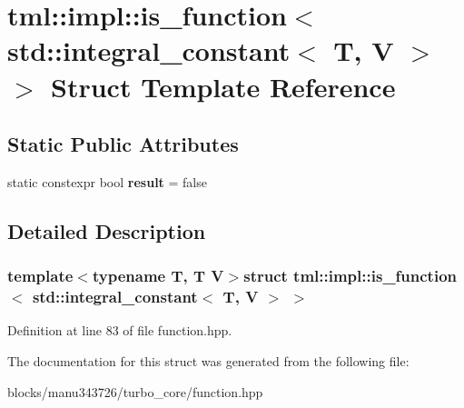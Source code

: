 \hypertarget{structtml_1_1impl_1_1is__function_3_01std_1_1integral__constant_3_01_t_00_01_v_01_4_01_4}{\section{tml\+:\+:impl\+:\+:is\+\_\+function$<$ std\+:\+:integral\+\_\+constant$<$ T, V $>$ $>$ Struct Template Reference}
\label{structtml_1_1impl_1_1is__function_3_01std_1_1integral__constant_3_01_t_00_01_v_01_4_01_4}
}
\subsection*{Static Public Attributes}
\begin{DoxyCompactItemize}
\item 
\hypertarget{structtml_1_1impl_1_1is__function_3_01std_1_1integral__constant_3_01_t_00_01_v_01_4_01_4_a6bb3fa699238b79503ae99c612fef79c}{static constexpr bool {\bfseries result} = false}\label{structtml_1_1impl_1_1is__function_3_01std_1_1integral__constant_3_01_t_00_01_v_01_4_01_4_a6bb3fa699238b79503ae99c612fef79c}

\end{DoxyCompactItemize}


\subsection{Detailed Description}
\subsubsection*{template$<$typename T, T V$>$struct tml\+::impl\+::is\+\_\+function$<$ std\+::integral\+\_\+constant$<$ T, V $>$ $>$}



Definition at line 83 of file function.\+hpp.



The documentation for this struct was generated from the following file\+:\begin{DoxyCompactItemize}
\item 
blocks/manu343726/turbo\+\_\+core/function.\+hpp\end{DoxyCompactItemize}
